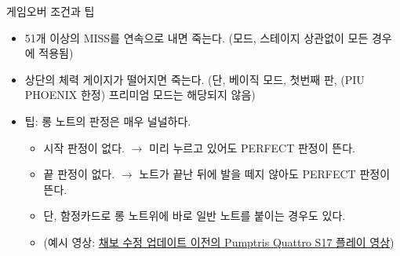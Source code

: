 \documentclass{beamer}
\begin{document}
\begin{frame}{게임오버 조건과 팁}
	\begin{itemize}
		\item 51개 이상의 MISS를 연속으로 내면 죽는다. (모드, 스테이지 상관없이 모든 경우에 적용됨)
		\item 상단의 체력 게이지가 떨어지면 죽는다. (단, 베이직 모드, 첫번째 판, (PIU PHOENIX 한정) 프리미엄 모드는 해당되지 않음)
		\item 팁: 롱 노트의 판정은 매우 널널하다.
		\begin{itemize}
			\item 시작 판정이 없다. $ \rightarrow $ 미리 누르고 있어도 PERFECT 판정이 뜬다.
			\item 끝 판정이 없다. $ \rightarrow $ 노트가 끝난 뒤에 발을 떼지 않아도 PERFECT 판정이 뜬다.
			\item 단, 함정카드로 롱 노트위에 바로 일반 노트를 붙이는 경우도 있다.
			\item (예시 영상: \href{https://www.youtube.com/watch?v=720QPEJxJ3o}{채보 수정 업데이트 이전의 Pumptris Quattro S17 플레이 영상})
		\end{itemize}
	\end{itemize}
\end{frame}
\end{document}
